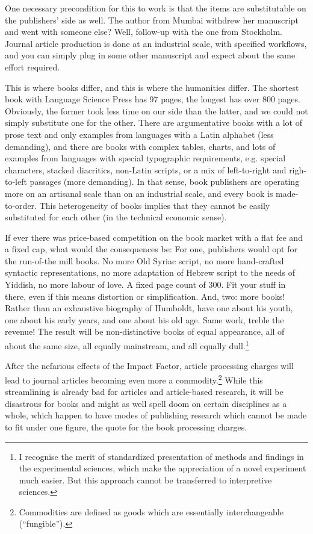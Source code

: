 \documentclass[12pt]{article}
\begin{document}
 One necessary precondition for this to work is that the items are substitutable on the publishers' side as well. The author from Mumbai withdrew her manuscript and went with someone else? Well, follow-up with the one from Stockholm. Journal article production is done at an industrial scale, with specified workflows, and you can simply plug in some other manuscript and expect about the same effort required. 
 
 This is where books differ, and this is where the humanities differ. The shortest book with Language Science Press has 97 pages, the longest has over 800 pages. Obviously, the former took less time on our side than the latter, and we could not simply substitute one for the other. There are argumentative books with a lot of prose text and only examples from languages with a Latin alphabet (less demanding), and there are books with complex tables, charts, and lots of examples from languages with special typographic requirements, e.g. special characters, stacked diacritics, non-Latin scripts, or a mix of left-to-right and righ-to-left passages (more demanding). In that sense, book publishers are operating more on an artisanal scale than on an industrial scale, and every book is made-to-order. This heterogeneity of books implies that they cannot be easily substituted for each other (in the technical economic sense).
 
 If ever there was price-based competition on the book market with a flat fee and a fixed cap, what would the consequences be: For one, publishers would opt for the run-of-the mill books. No more Old Syriac script,%
 no more hand-crafted syntactic representations, no more adaptation of Hebrew script to the needs of Yiddish, no more labour of love. A fixed page count of 300. Fit your stuff in there, even if this means distortion or simplification. And, two: more books! Rather than an exhaustive biography of Humboldt, have one about his youth, one about his early years, and one about his old age. Same work, treble the revenue! The result will be non-distinctive books of equal appearance, all of about the same size, all equally mainstream, and all equally dull.\footnote{I recognise the merit of standardized presentation of methods and findings in the experimental sciences, which make the appreciation of a novel experiment much easier. But this approach cannot be transferred to interpretive sciences.}
 
 After the nefarious effects of the Impact Factor, article processing charges will lead to journal articles becoming even more a commodity.\footnote{Commodities are defined as  goods which are essentially interchangeable (``fungible'').} While this streamlining is already bad for articles and article-based research, it will be disastrous for books and might as well spell doom on certain disciplines as a whole, which happen to have modes of publishing research which cannot be made to fit under one figure, the quote for the book processing charges. 
\end{document}
